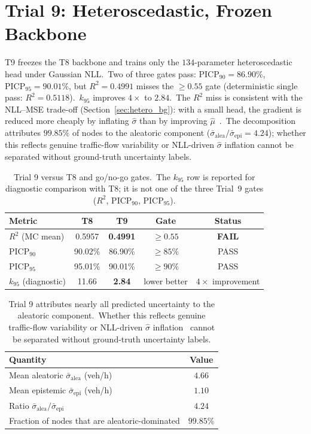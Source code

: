\section{Trial 9: Heteroscedastic, Frozen Backbone}\label{sec:t9_results}

T9 freezes the T8 backbone and trains only the $134$-parameter heteroscedastic head under Gaussian NLL.\ Two of three gates pass: $\mathrm{PICP}_{90} = 86.90\%$, $\mathrm{PICP}_{95} = 90.01\%$, but $R^2 = 0.4991$ misses the $\geq 0.55$ gate (deterministic single pass: $R^2 = 0.5118$).\ $k_{95}$ improves $4\times$ to $2.84$.\ The $R^2$ miss is consistent with the NLL--MSE trade-off (Section~\ref{sec:hetero_bg}): with a small head, the gradient is reduced more cheaply by inflating $\hat\sigma$ than by improving $\hat\mu$~\cite{seitzer2022pitfalls}.\ The decomposition attributes $99.85\%$ of nodes to the aleatoric component ($\bar\sigma_\text{alea}/\bar\sigma_\text{epi} = 4.24$); whether this reflects genuine traffic-flow variability or NLL-driven $\hat\sigma$ inflation cannot be separated without ground-truth uncertainty labels.

\begin{table}[htbp]
\centering
\caption[Trial 9 gate check]{Trial 9 versus T8 and go/no-go gates.\ The $k_{95}$ row is reported for diagnostic comparison with T8; it is not one of the three Trial~9 gates ($R^2$, PICP$_{90}$, PICP$_{95}$).}
\label{tab:t9_gates}
\begin{tabular}{lcccc}
\toprule
Metric & T8 & T9 & Gate & Status \\
\midrule
$R^2$ (MC mean) & 0.5957 & \textbf{0.4991} & $\geq 0.55$ & \textbf{FAIL} \\
PICP$_{90}$ & 90.02\% & 86.90\% & $\geq 85\%$ & PASS \\
PICP$_{95}$ & 95.01\% & 90.01\% & $\geq 90\%$ & PASS \\
$k_{95}$ (diagnostic) & 11.66 & \textbf{2.84} & lower better & $4\times$ improvement \\
\bottomrule
\end{tabular}
\end{table}

\begin{table}[htbp]
\centering
\caption[Trial 9 aleatoric vs epistemic decomposition]{Trial 9 attributes nearly all predicted uncertainty to the aleatoric component.\ Whether this reflects genuine traffic-flow variability or NLL-driven $\hat\sigma$ inflation~\cite{seitzer2022pitfalls} cannot be separated without ground-truth uncertainty labels.}
\label{tab:t9_decomp}
\begin{tabular}{lc}
\toprule
Quantity & Value \\
\midrule
Mean aleatoric $\bar\sigma_\text{alea}$ (veh/h) & $4.66$ \\
Mean epistemic $\bar\sigma_\text{epi}$ (veh/h) & $1.10$ \\
Ratio $\bar\sigma_\text{alea} / \bar\sigma_\text{epi}$ & $4.24$ \\
Fraction of nodes that are aleatoric-dominated & $99.85\%$ \\
\bottomrule
\end{tabular}
\end{table}

